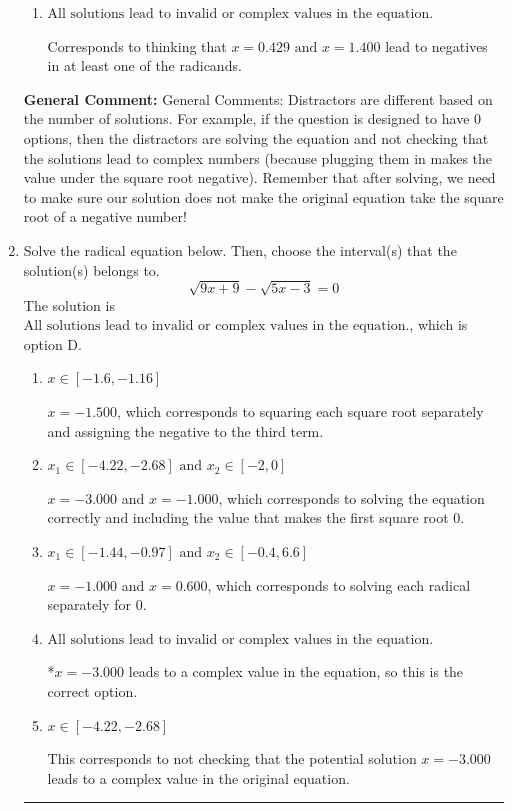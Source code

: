 \documentclass{extbook}[14pt]
\newcommand{\litem}[1]{\item #1

\rule{\textwidth}{0.4pt}}
\begin{document}
\begin{enumerate}
{\begin{enumerate}[label=\Alph*.]
$x = 0.429$, which corresponds to thinking that $x = 1.400$ leads to a negative in at least one of the radicands.
\item \( \text{All solutions lead to invalid or complex values in the equation.} \)

Corresponds to thinking that $x = 0.429 \text{ and } x = 1.400$ lead to negatives in at least one of the radicands.
\end{enumerate}

\textbf{General Comment:} General Comments: Distractors are different based on the number of solutions. For example, if the question is designed to have 0 options, then the distractors are solving the equation and not checking that the solutions lead to complex numbers (because plugging them in makes the value under the square root negative). Remember that after solving, we need to make sure our solution does not make the original equation take the square root of a negative number!
}
\litem{
Solve the radical equation below. Then, choose the interval(s) that the solution(s) belongs to.
\[ \sqrt{9 x + 9} - \sqrt{5 x - 3} = 0 \]
The solution is \( \text{All solutions lead to invalid or complex values in the equation.} \), which is option D.\begin{enumerate}[label=\Alph*.]
\item \( x \in [-1.6,-1.16] \)

$x = -1.500$, which corresponds to squaring each square root separately and assigning the negative to the third term.
\item \( x_1 \in [-4.22, -2.68] \text{ and } x_2 \in [-2,0] \)

$x = -3.000$ and $x = -1.000$, which corresponds to solving the equation correctly and including the value that makes the first square root 0.
\item \( x_1 \in [-1.44, -0.97] \text{ and } x_2 \in [-0.4,6.6] \)

$x = -1.000$ and $x = 0.600$, which corresponds to solving each radical separately for 0.
\item \( \text{All solutions lead to invalid or complex values in the equation.} \)

*$x = -3.000$ leads to a complex value in the equation, so this is the correct option.
\item \( x \in [-4.22,-2.68] \)

This corresponds to not checking that the potential solution $x = -3.000$ leads to a complex value in the original equation.
\end{enumerate}

}
\end{enumerate}
\end{document}
